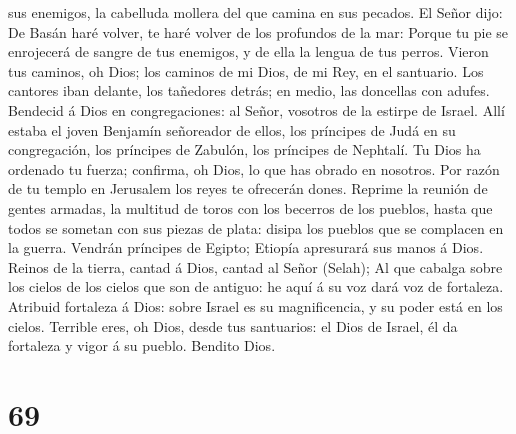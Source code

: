 sus enemigos, la cabelluda mollera del que camina en sus pecados.
 El Señor dijo: De Basán haré volver, te haré volver de los
profundos de la mar:  Porque tu pie se enrojecerá de sangre
de tus enemigos, y de ella la lengua de tus perros.  Vieron
tus caminos, oh Dios; los caminos de mi Dios, de mi Rey, en el
santuario.  Los cantores iban delante, los tañedores
detrás; en medio, las doncellas con adufes.  Bendecid á
Dios en congregaciones: al Señor, vosotros de la estirpe de Israel.
 Allí estaba el joven Benjamín señoreador de ellos, los
príncipes de Judá en su congregación, los príncipes de Zabulón, los
príncipes de Nephtalí.  Tu Dios ha ordenado tu fuerza;
confirma, oh Dios, lo que has obrado en nosotros.  Por
razón de tu templo en Jerusalem los reyes te ofrecerán dones.
 Reprime la reunión de gentes armadas, la multitud de toros
con los becerros de los pueblos, hasta que todos se sometan con sus
piezas de plata: disipa los pueblos que se complacen en la guerra.
 Vendrán príncipes de Egipto; Etiopía apresurará sus manos
á Dios.  Reinos de la tierra, cantad á Dios, cantad al
Señor (Selah);  Al que cabalga sobre los cielos de los
cielos que son de antiguo: he aquí á su voz dará voz de fortaleza.
 Atribuid fortaleza á Dios: sobre Israel es su
magnificencia, y su poder está en los cielos.  Terrible
eres, oh Dios, desde tus santuarios: el Dios de Israel, él da fortaleza
y vigor á su pueblo. Bendito Dios.

\hypertarget{section-68}{%
\section{69}\label{section-68}}

